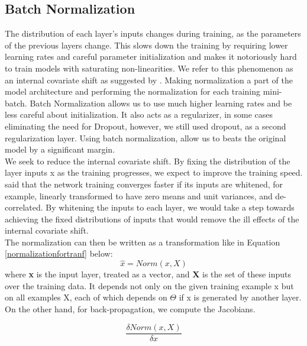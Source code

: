 \subsection{Batch Normalization}
The distribution of each layer's inputs changes during training, as the parameters of the previous layers change. This slows down the training by requiring lower learning rates and careful parameter initialization and makes it notoriously hard to train models with saturating non-linearities. We refer to this phenomenon as an internal covariate shift as suggested by \cite{ioffe2015batch}. Making normalization a part of the model architecture and performing the normalization for each training mini-batch. Batch Normalization allows us to use much higher learning rates and be less careful about initialization. It also acts as a regularizer, in some cases eliminating the need for Dropout, however, we still used dropout, as a second regularization layer. Using batch normalization, allow us to beats the original model by a significant margin.\\

We seek to reduce the internal covariate shift. By fixing the distribution of the layer inputs x as the training progresses, we expect to improve the training speed. \cite{lecun2012efficient} said that the network training converges faster if its inputs are whitened, for example, linearly transformed to have zero means and unit variances, and de-correlated. By whitening the inputs to each layer, we would take a step towards achieving the fixed distributions of inputs that would remove the ill effects of the
internal covariate shift.\\

The normalization can then be written as a transformation like in Equation \ref{normalizationfortranf} below:
\begin{equation}\label{normalizationfortranf}
     \widehat{x}=Norm(x,X)
\end{equation}
where \textbf{x} is the input layer, treated as a vector, and \textbf{X} is the set of these inputs over the training data. It depends not only on the given training example x but on all examples X, each of which depends on $\Theta$ if
x is generated by another layer. On the other hand, for back-propagation, we compute the Jacobians.

\begin{equation}\label{derivative1}
     \frac{\delta Norm(x,X)}{\delta x}
\end{equation}

